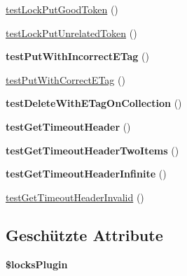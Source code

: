 \begin{DoxyCompactItemize}
\item 
\mbox{\hyperlink{class_sabre_1_1_d_a_v_1_1_locks_1_1_plugin_test_a00106b899ad734415322ddb2b471949a}{test\+Lock\+Put\+Good\+Token}} ()
\item 
\mbox{\hyperlink{class_sabre_1_1_d_a_v_1_1_locks_1_1_plugin_test_aee4f91d4bd41dde0be87e87f7516501e}{test\+Lock\+Put\+Unrelated\+Token}} ()
\item 
\mbox{\label{class_sabre_1_1_d_a_v_1_1_locks_1_1_plugin_test_ab1b51ca69a4a2b2e19b80fd3a08c8910}} 
{\bfseries test\+Put\+With\+Incorrect\+E\+Tag} ()
\item 
\mbox{\hyperlink{class_sabre_1_1_d_a_v_1_1_locks_1_1_plugin_test_a31ce8827307eb456064cc1c4088d2fcb}{test\+Put\+With\+Correct\+E\+Tag}} ()
\item 
\mbox{\label{class_sabre_1_1_d_a_v_1_1_locks_1_1_plugin_test_a9c3b9677a972424128e0f245141bd46b}} 
{\bfseries test\+Delete\+With\+E\+Tag\+On\+Collection} ()
\item 
\mbox{\label{class_sabre_1_1_d_a_v_1_1_locks_1_1_plugin_test_aadbc9a989ae7f128835642f7f0d66926}} 
{\bfseries test\+Get\+Timeout\+Header} ()
\item 
\mbox{\label{class_sabre_1_1_d_a_v_1_1_locks_1_1_plugin_test_a632bf4914f7a29a2da2deb6c239c1d5b}} 
{\bfseries test\+Get\+Timeout\+Header\+Two\+Items} ()
\item 
\mbox{\label{class_sabre_1_1_d_a_v_1_1_locks_1_1_plugin_test_afbe00383f450f55a613f8cb2c5111b21}} 
{\bfseries test\+Get\+Timeout\+Header\+Infinite} ()
\item 
\mbox{\hyperlink{class_sabre_1_1_d_a_v_1_1_locks_1_1_plugin_test_a8234c154ac474b13cf058129750d5dc3}{test\+Get\+Timeout\+Header\+Invalid}} ()
\end{DoxyCompactItemize}
\subsection*{Geschützte Attribute}
\begin{DoxyCompactItemize}
\item 
\mbox{\label{class_sabre_1_1_d_a_v_1_1_locks_1_1_plugin_test_a4359a55b91cedf0724f9ccaef24b1192}} 
{\bfseries \$locks\+Plugin}
\end{DoxyCompactItemize}
